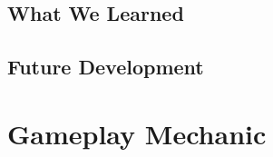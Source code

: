 \documentclass[conference]{IEEEtran}
\begin{document}
\subsection{What We Learned}

\subsection{Future Development}

\appendices%
\section{Gameplay Mechanic}\label{app:gameplay}




\end{document}
